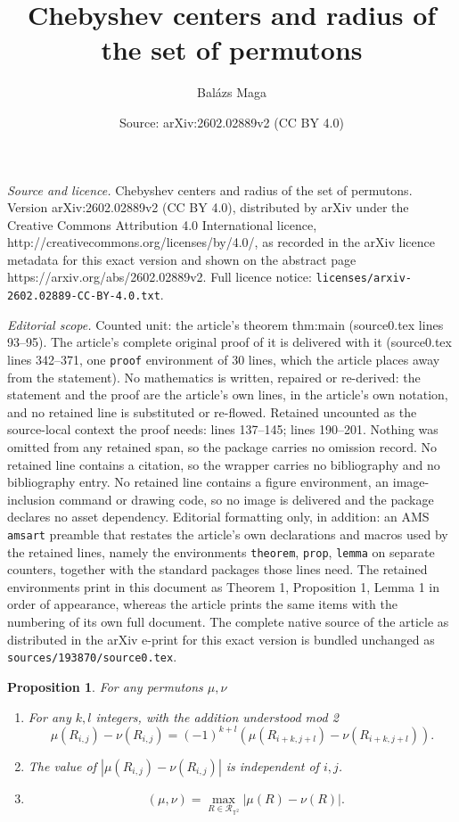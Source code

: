 \documentclass[10pt,a4paper]{amsart}
\title{Chebyshev centers and radius of the set of permutons}
\author{Bal\'azs Maga}
\date{Source: arXiv:2602.02889v2 (CC BY 4.0)}
\newtheorem{prop}{Proposition}
\newcommand{\ds}{\mathop{d_\square}}
\begin{document}
\maketitle

\noindent\emph{Source and licence.} Chebyshev centers and radius of the set of permutons. Version arXiv:2602.02889v2 (CC BY 4.0), distributed by arXiv under the Creative Commons Attribution 4.0 International licence, http://creativecommons.org/licenses/by/4.0/, as recorded in the arXiv licence metadata for this exact version and shown on the abstract page https://arxiv.org/abs/2602.02889v2. Full licence notice: \texttt{licenses/arxiv-2602.02889-CC-BY-4.0.txt}.\par\smallskip

\noindent\textit{Editorial scope.} Counted unit: the article's theorem thm:main (source0.tex lines 93--95). The article's complete original proof of it is delivered with it (source0.tex lines 342--371, one \texttt{proof} environment of 30 lines, which the article places away from the statement). No mathematics is written, repaired or re-derived: the statement and the proof are the article's own lines, in the article's own notation, and no retained line is substituted or re-flowed.  Retained uncounted as the source-local context the proof needs: lines 137--145; lines 190--201.  Nothing was omitted from any retained span, so the package carries no omission record.  No retained line contains a citation, so the wrapper carries no bibliography and no bibliography entry.  No retained line contains a figure environment, an image-inclusion command or drawing code, so no image is delivered and the package declares no asset dependency.  Editorial formatting only, in addition: an AMS \texttt{amsart} preamble that restates the article's own declarations and macros used by the retained lines, namely the environments \texttt{theorem}, \texttt{prop}, \texttt{lemma} on separate counters, together with the standard packages those lines need.  The retained environments print in this document as Theorem 1, Proposition 1, Lemma 1 in order of appearance, whereas the article prints the same items with the numbering of its own full document.  The complete native source of the article as distributed in the arXiv e-print for this exact version is bundled unchanged as \texttt{sources/193870/source0.tex}.
\begin{prop} \label{prop:torus_unit_square_identification}
    For any permutons $\mu, \nu$
    \begin{enumerate}[label=(\roman*)]
        \item{For any $k, l$ integers, with the addition understood mod 2
        $$\mu(R_{i, j})-\nu(R_{i, j})=(-1)^{k+l}\left(\mu(R_{i+k, j+l})-\nu(R_{i+k, j+l})\right).$$}\label{item1:prop:torus_unit_square_identification}
        \item The value of $|\mu(R_{i, j})-\nu(R_{i, j})|$ is independent of $i, j$.
        \item $$\ds(\mu, \nu)=\max_{R\in\mathcal{R}_{\mathbb{T}^2}}|\mu(R)-\nu(R)|.$$
    \end{enumerate}
\end{prop}
\end{document}
